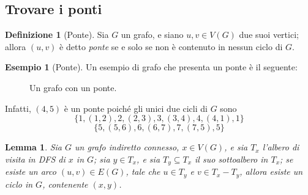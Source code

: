 \documentclass[14pt]{extreport}
\newtheorem{lemma}{Lemma}[subsection]
\theoremstyle{definition}
\newtheorem{definition}{Definizione}[subsection]
\theoremstyle{definition}
\newtheorem{example}{Esempio}[subsection]
\begin{document}
\subsection{Trovare i ponti}

\begin{definition}[Ponte]
    Sia $G$ un grafo, e siano $u, v \in V(G)$ due suoi vertici; allora $(u, v)$ è detto \textit{ponte} se e solo se non è contenuto in nessun ciclo di $G$.
\end{definition}

\begin{example}[Ponte]
    Un esempio di grafo che presenta un ponte è il seguente:

    \begin{figure}[H]
        \centering
        \caption{Un grafo con un ponte.}
    \end{figure}

    Infatti, $(4, 5)$ è un ponte poiché gli unici due cicli di $G$ sono $$\{1, (1, 2), 2, (2, 3), 3, (3, 4), 4, (4, 1), 1\}$$ $$\{5, (5, 6), 6, (6, 7), 7, (7, 5), 5\}$$
\end{example}

\begin{lemma}
    Sia $G$ un grafo indiretto connesso, $x \in V(G)$, e sia $T_x$ l'albero di visita in DFS di $x$ in $G$; sia $y \in T_x$, e sia $T_y \subseteq T_x$ il suo sottoalbero in $T_x$; se esiste un arco $(u, v) \in E(G)$, tale che $u \in T_y$ e $v \in T_x - T_y$, allora esiste un ciclo in $G$, contenente $(x, y)$.
\end{lemma}
\end{document}
